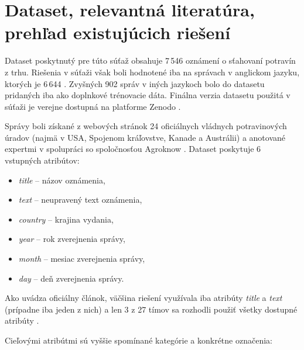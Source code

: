 \section{Dataset, relevantná literatúra, prehľad existujúcich riešení}

Dataset poskytnutý pre túto súťaž obsahuje 7\,546 oznámení o sťahovaní potravín z trhu. Riešenia v súťaži však boli hodnotené iba na správach v anglickom jazyku, ktorých je 6\,644 \cite{randl-etal-2025-semeval, randl_2025_15007331}. Zvyšných 902 správ v iných jazykoch bolo do datasetu pridaných iba ako doplnkové trénovacie dáta. Finálna verzia datasetu použitá v súťaži je verejne dostupná na platforme Zenodo \cite{randl_2025_15007331}.

Správy boli získané z webových stránok 24 oficiálnych vládnych potravinových úradov (najmä v USA, Spojenom kráľovstve, Kanade a Austrálii) a anotované expertmi v spolupráci so spoločnosťou Agroknow \cite{randl_2025_15007331}. Dataset poskytuje 6 vstupných atribútov:

\begin{itemize}
    \item \textit{title} -- názov oznámenia,
    \item \textit{text} -- neupravený text oznámenia,
    \item \textit{country} -- krajina vydania,
    \item \textit{year} -- rok zverejnenia správy,
    \item \textit{month} -- mesiac zverejnenia správy,
    \item \textit{day} -- deň zverejnenia správy.
\end{itemize}

Ako uvádza oficiálny článok, väčšina riešení využívala iba atribúty \textit{title} a \textit{text} (prípadne iba jeden z nich) a len 3 z 27 tímov sa rozhodli použiť všetky dostupné atribúty \cite{randl-etal-2025-semeval}.

Cieľovými atribútmi sú vyššie spomínané kategórie a konkrétne označenia:

